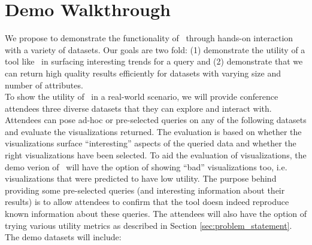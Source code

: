 
\section{Demo Walkthrough}
\label{demo-walkthrough}

We propose to demonstrate the functionality of \SeeDB\ through hands-on
interaction with a variety of datasets. Our goals are two fold: (1) demonstrate
the utility of a tool like \SeeDB\ in surfacing interesting trends for a query
and (2) demonstrate that we can return high quality results efficiently for
datasets with varying size and number of attributes.\\

 To show the utility of \SeeDB\ in a real-world
scenario, we will provide conference attendees three diverse datasets that they
can explore and interact with. Attendees can pose ad-hoc or pre-selected queries
on any of the following datasets and evaluate the visualizations returned. The
evaluation is based on whether the visualizations surface ``interesting''
aspects of the queried data and whether the right visualizations have been
selected. To aid the evaluation of visualizations, the demo verion of \SeeDB\
will have the option of showing ``bad'' visualizations too, i.e. visualizations
that were predicted to have low utility. The purpose behind providing some
pre-selected queries (and interesting information about their results) is to
allow attendees to confirm that the tool doesn indeed reproduce known
information about these queries. The attendees will also have the option of
trying various utility metrics as described in Section
\ref{sec:problem_statement}. The demo datasets will include:
 
